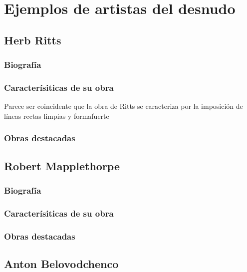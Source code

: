\chapter{Ejemplos de artistas del desnudo}

\section{Herb Ritts}

\subsection{Biograf\'ia}

\subsection{Caracter\'isiticas de su obra}

Parece ser coincidente que la obra de Ritts se caracteriza por la imposici\'on de l\'ineas rectas limpias\cite{ciherbritts} y \gls{formafuerte}

\subsection{Obras destacadas}



\section{Robert Mapplethorpe}

\subsection{Biograf\'ia}

\subsection{Caracter\'isiticas de su obra}


\subsection{Obras destacadas}

\section{Anton Belovodchenco}

